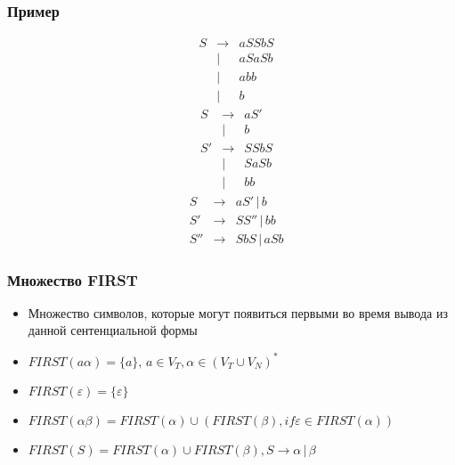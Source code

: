\documentclass{beamer}
\begin{document}
\begin{frame}[fragile]
  \transwipe[direction=90]
  \frametitle{Пример}
  $$
  \begin{array}{crcl}
  &S& \rightarrow & a S S b S \\
  & &           | & a S a S b \\
  & &           | & a b b \\
  & &           | & b 
  \end{array}
  $$
 \pause
  $$
  \begin{array}{crcl}
  &S & \rightarrow & a S' \\
  &  &           | & b \\
  
  &S'& \rightarrow & S S b S \\
  &  &           | & S a S b \\
  &  &           | & b b 
  \end{array}
  $$ 
  \pause
  $$
  \begin{array}{crcl}
  &S  & \rightarrow & a S' \, | \, b \\
  
  &S' & \rightarrow & S S'' \, | \, b b \\
  
  &S''& \rightarrow & S b S \, | \, a S b 
  \end{array}
  $$
\end{frame}

\begin{frame}[fragile]
  \transwipe[direction=90]
  \frametitle{Множество FIRST}
  \begin{itemize}
   \item Множество символов, которые могут появиться первыми во время вывода из данной сентенциальной формы
   \item $FIRST(a \alpha) = \{ a \}, \, a \in V_T, \alpha \in (V_T \cup V_N)^*$
   \item $FIRST(\varepsilon) = \{ \varepsilon \}$
   \item $FIRST(\alpha \beta) = FIRST(\alpha) \cup (FIRST(\beta), if \varepsilon \in FIRST(\alpha))$
   \item $FIRST(S) = FIRST(\alpha) \cup FIRST(\beta), S \rightarrow \alpha \, | \, \beta $
  \end{itemize}
\end{frame}
\end{document}
